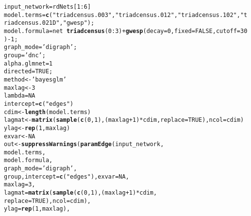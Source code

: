 \documentclass[12pt]{article}\usepackage[]{graphicx}\usepackage[]{color}
\makeatletter
\newcommand{\hlnum}[1]{\textcolor[rgb]{0.686,0.059,0.569}{#1}}%
\newcommand{\hlstr}[1]{\textcolor[rgb]{0.192,0.494,0.8}{#1}}%
\newcommand{\hlopt}[1]{\textcolor[rgb]{0,0,0}{#1}}%
\newcommand{\hlstd}[1]{\textcolor[rgb]{0.345,0.345,0.345}{#1}}%
\newcommand{\hlkwb}[1]{\textcolor[rgb]{0.69,0.353,0.396}{#1}}%
\newcommand{\hlkwc}[1]{\textcolor[rgb]{0.333,0.667,0.333}{#1}}%
\newcommand{\hlkwd}[1]{\textcolor[rgb]{0.737,0.353,0.396}{\textbf{#1}}}%
\newenvironment{kframe}{%
 \def\at@end@of@kframe{}%
 \ifinner\ifhmode%
  \def\at@end@of@kframe{\end{minipage}}%
  \begin{minipage}{\columnwidth}%
 \fi\fi%
 \def\FrameCommand##1{\hskip\@totalleftmargin \hskip-\fboxsep
 \colorbox{shadecolor}{##1}\hskip-\fboxsep
     \hskip-\linewidth \hskip-\@totalleftmargin \hskip\columnwidth}%
 \MakeFramed {\advance\hsize-\width
   \@totalleftmargin\z@ \linewidth\hsize
   \@setminipage}}%
 {\par\unskip\endMakeFramed%
 \at@end@of@kframe}
\newenvironment{knitrout}{}{} %
\makeatother
\begin{document}
\begin{knitrout}
\color{fgcolor}\begin{kframe}
\begin{alltt}
\hlstd{input_network}\hlkwb{=}\hlstd{rdNets[}\hlnum{1}\hlopt{:}\hlnum{6}\hlstd{]}
\hlstd{model.terms}\hlkwb{=}\hlkwd{c}\hlstd{(}\hlstr{"triadcensus.003"}\hlstd{,} \hlstr{"triadcensus.012"}\hlstd{,} \hlstr{"triadcensus.102"}\hlstd{,} \hlstr{"triadcensus.021D"}\hlstd{,} \hlstr{"gwesp"}\hlstd{);}
\hlstd{model.formula} \hlkwb{=} \hlstd{net}\hlopt{~}\hlkwd{triadcensus}\hlstd{(}\hlnum{0}\hlopt{:}\hlnum{3}\hlstd{)}\hlopt{+}\hlkwd{gwesp}\hlstd{(}\hlkwc{decay}\hlstd{=}\hlnum{0}\hlstd{,} \hlkwc{fixed}\hlstd{=}\hlnum{FALSE}\hlstd{,} \hlkwc{cutoff}\hlstd{=}\hlnum{30}\hlstd{)}\hlopt{-}\hlnum{1}\hlstd{;}
\hlstd{graph_mode}\hlkwb{=}\hlstr{'digraph'}\hlstd{;}
\hlstd{group}\hlkwb{=}\hlstr{'dnc'}\hlstd{;}
\hlstd{alpha.glmnet}\hlkwb{=}\hlnum{1}
\hlstd{directed}\hlkwb{=}\hlnum{TRUE}\hlstd{;}
\hlstd{method} \hlkwb{<-} \hlstr{'bayesglm'}
\hlstd{maxlag} \hlkwb{<-} \hlnum{3}
\hlstd{lambda}\hlkwb{=}\hlnum{NA}
\hlstd{intercept} \hlkwb{=} \hlkwd{c}\hlstd{(}\hlstr{"edges"}\hlstd{)}
\hlstd{cdim} \hlkwb{<-} \hlkwd{length}\hlstd{(model.terms)}
\hlstd{lagmat} \hlkwb{<-} \hlkwd{matrix}\hlstd{(}\hlkwd{sample}\hlstd{(}\hlkwd{c}\hlstd{(}\hlnum{0}\hlstd{,}\hlnum{1}\hlstd{),(maxlag}\hlopt{+}\hlnum{1}\hlstd{)}\hlopt{*}\hlstd{cdim,}\hlkwc{replace} \hlstd{=} \hlnum{TRUE}\hlstd{),}\hlkwc{ncol} \hlstd{= cdim)}
\hlstd{ylag} \hlkwb{<-} \hlkwd{rep}\hlstd{(}\hlnum{1}\hlstd{,maxlag)}
\hlstd{exvar} \hlkwb{<-} \hlnum{NA}
\hlstd{out} \hlkwb{<-} \hlkwd{suppressWarnings}\hlstd{(}\hlkwd{paramEdge}\hlstd{(input_network,}
                                  \hlstd{model.terms,}
                                  \hlstd{model.formula,}
                                  \hlkwc{graph_mode}\hlstd{=}\hlstr{'digraph'}\hlstd{,}
                                  \hlstd{group,}\hlkwc{intercept} \hlstd{=} \hlkwd{c}\hlstd{(}\hlstr{"edges"}\hlstd{),}\hlkwc{exvar}\hlstd{=}\hlnum{NA}\hlstd{,}
                                  \hlkwc{maxlag} \hlstd{=} \hlnum{3}\hlstd{,}
                                  \hlkwc{lagmat} \hlstd{=} \hlkwd{matrix}\hlstd{(}\hlkwd{sample}\hlstd{(}\hlkwd{c}\hlstd{(}\hlnum{0}\hlstd{,}\hlnum{1}\hlstd{),(maxlag}\hlopt{+}\hlnum{1}\hlstd{)}\hlopt{*}\hlstd{cdim,}
                                                         \hlkwc{replace} \hlstd{=} \hlnum{TRUE}\hlstd{),}\hlkwc{ncol} \hlstd{= cdim),}
                                  \hlkwc{ylag} \hlstd{=} \hlkwd{rep}\hlstd{(}\hlnum{1}\hlstd{,maxlag),}

\end{alltt}
\end{kframe}
\end{knitrout}
\end{document}
